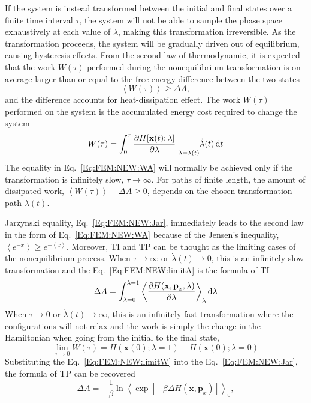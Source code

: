 If the system is instead transformed between the initial and final states over a finite time interval $\tau$, the system will not be able to sample the phase space exhaustively at each value of $\lambda$, making this transformation irreversible. As the transformation proceeds, the system will be gradually driven out of equilibrium, causing hysteresis effects. From the second law of thermodynamic, it is expected that the work $W(\tau)$ performed during the nonequilibrium transformation is on average larger than or equal to the free energy difference between the two states
\begin{equation}
\left \langle W(\tau) \right \rangle \ge \Delta A,
\label{Eq:FEM:NEW:WA}
\end{equation} 
and the difference accounts for heat-dissipation effect. The work $W(\tau)$ performed on the system is the accumulated energy cost required to change the system
\begin{equation}
W(\tau) = \int_{0}^{\tau} \frac{\partial{H[\textbf{x}(t);\lambda]}}{\partial{\lambda}}\bigg\rvert_{\lambda=\lambda(t)} \dot{\lambda}(t) \mathop{}\!\mathrm{d} t
\label{Eq:FEM:NEW:work}
\end{equation}    
The equality in Eq.~\ref{Eq:FEM:NEW:WA} will normally be achieved only if the transformation is infinitely slow, $\tau\to\infty$.  For paths of finite length, the amount of dissipated work, $\left \langle W(\tau) \right \rangle - \Delta A \ge 0$, depends on the chosen transformation path $\lambda(t)$.

Jarzynski equality, Eq.~\ref{Eq:FEM:NEW:Jar}, immediately leads to the second law in the form of Eq.~\ref{Eq:FEM:NEW:WA} because of the Jensen's inequality, $\left \langle e^{-x} \right \rangle \ge e^{-\left<x\right>} $.
Moreover, TI and TP can be thought as the limiting cases of the nonequilibrium process. When $\tau\to\infty$ or $\dot{\lambda}(t)\to0$, this is an infinitely slow transformation and the Eq.~\ref{Eq:FEM:NEW:limitA} is the formula of TI
\begin{equation}
\Delta A = \int_{\lambda=0}^{\lambda=1}\left \langle \frac{\partial{H(\textbf{x},\textbf{p}_{x},\lambda)}}{\partial{\lambda}} \right \rangle_{\lambda} \mathop{}\!\mathrm{d}\lambda
\label{Eq:FEM:NEW:TINEW}
\end{equation}  
When $\tau\to0$ or $\dot{\lambda}(t)\to\infty$, this is an infinitely fast transformation where the configurations will not relax and the work is simply the change in the Hamiltonian when going from the initial to the final state,
\begin{equation}
\lim_{\tau\to0}W(\tau) = H(\textbf{x}(0);\lambda=1)-H(\textbf{x}(0);\lambda=0)
\label{Eq:FEM:NEW:limitW}
\end{equation}
Substituting the Eq.~\ref{Eq:FEM:NEW:limitW} into the Eq.~\ref{Eq:FEM:NEW:Jar}, the formula of TP can be recovered
\begin{equation}
\Delta A = -\frac{1}{\beta} \ln \left \langle \exp[-\beta \Delta H(\textbf{x},\textbf{p}_{x})] \right \rangle _{0},
\label{Eq:FEM:NEW:deltaA4NEW}
\end{equation}

